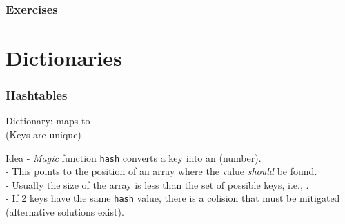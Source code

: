 \documentclass[aspectratio=169]{beamer}
\begin{document}
\begin{frame}\frametitle{Exercises}
\end{frame}


\section{Dictionaries}

\begin{frame}\frametitle{Hashtables}

\alert{Dictionary:} maps  to 
\\
(Keys are unique)

\begin{block}{Idea}
  - \alert{\emph{Magic} function \texttt{hash}} converts a key into an  (number).
  \\- This  points to the position of an array where the value \emph{should} be found.
  \\- Usually the size of the array is \alert{less} than the set of possible keys, i.e., .
  \\- If 2 keys have the same \texttt{hash} value, there is a \alert{colision} that must be mitigated (alternative solutions exist).
\end{block}

\end{frame}
\end{document}
